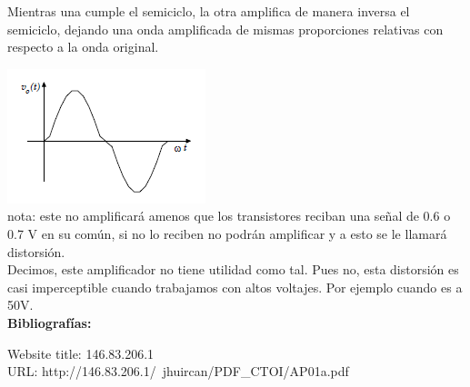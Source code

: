\documentclass[letterpaper]{article}
\begin{document}
\begin{large}
Mientras una cumple el semiciclo, la otra amplifica de manera inversa el semiciclo, dejando una onda amplificada de mismas proporciones relativas con respecto a la onda original.

\includegraphics[scale=1]{Imagenes/onda.png} 
\\
nota: este no amplificará amenos que los transistores reciban una señal de 0.6 o 0.7 V en su común, si no lo reciben no podrán amplificar y a esto se le llamará distorsión.\\

Decimos, este amplificador no tiene utilidad como tal. Pues no, esta distorsión es casi imperceptible cuando trabajamos con altos voltajes. Por ejemplo cuando es a 50V.\\
\textbf{Bibliografías:}

Website title: 	146.83.206.1\\
URL: 	http://146.83.206.1/~jhuircan/PDF_CTOI/AP01a.pdf


\end{large}
\end{document}
